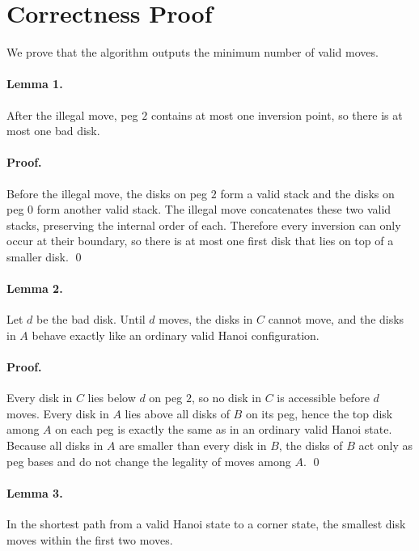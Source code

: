 \documentclass[11pt]{article}
\begin{document}
\section*{Correctness Proof}

We prove that the algorithm outputs the minimum number of valid moves.

\paragraph{Lemma 1.}
After the illegal move, peg $2$ contains at most one inversion point, so there is at most one bad disk.

\paragraph{Proof.}
Before the illegal move, the disks on peg $2$ form a valid stack and the disks on peg $0$ form another valid stack. The illegal move concatenates these two valid stacks, preserving the internal order of each. Therefore every inversion can only occur at their boundary, so there is at most one first disk that lies on top of a smaller disk. \qed

\paragraph{Lemma 2.}
Let $d$ be the bad disk. Until $d$ moves, the disks in $C$ cannot move, and the disks in $A$ behave exactly like an ordinary valid Hanoi configuration.

\paragraph{Proof.}
Every disk in $C$ lies below $d$ on peg $2$, so no disk in $C$ is accessible before $d$ moves. Every disk in $A$ lies above all disks of $B$ on its peg, hence the top disk among $A$ on each peg is exactly the same as in an ordinary valid Hanoi state. Because all disks in $A$ are smaller than every disk in $B$, the disks of $B$ act only as peg bases and do not change the legality of moves among $A$. \qed

\paragraph{Lemma 3.}
In the shortest path from a valid Hanoi state to a corner state, the smallest disk moves within the first two moves.
\end{document}
